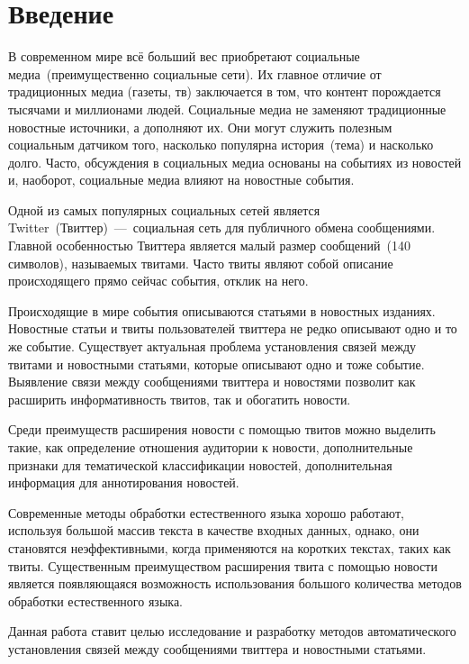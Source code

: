 \section*{Введение}
    В современном мире всё больший вес приобретают социальные медиа~(преимущественно социальные сети).
    Их главное отличие от традиционных медиа (газеты, тв) заключается в том, что контент порождается тысячами и миллионами людей.
    Социальные медиа не заменяют традиционные новостные источники, а дополняют их.
    Они могут служить полезным социальным датчиком того, насколько популярна история~(тема) и насколько долго.
    Часто, обсуждения в социальных медиа основаны на событиях из новостей и, наоборот, социальные медиа влияют на новостные события.

    Одной из самых популярных социальных сетей является Twitter~(Твиттер)~---~социальная сеть для публичного обмена сообщениями.
    Главной особенностью Твиттера является малый размер сообщений~(140 символов), называемых твитами.
    Часто твиты являют собой описание происходящего прямо сейчас события, отклик на него.

    Происходящие в мире события описываются статьями в новостных изданиях.
    Новостные статьи и твиты пользователей твиттера не редко описывают одно и то же событие.
    Существует актуальная проблема установления связей между твитами и новостными статьями, которые описывают одно и тоже событие.
    Выявление связи между сообщениями твиттера и новостями позволит как расширить информативность твитов, так и обогатить новости.

    Среди преимуществ расширения новости с помощью твитов можно выделить такие, как определение отношения аудитории к новости,
    дополнительные признаки для тематической классификации новостей, дополнительная информация для аннотирования новостей.

    Современные методы обработки естественного языка хорошо работают, используя большой массив текста в качестве входных данных, однако, они становятся неэффективными,
    когда применяются на коротких текстах, таких как твиты.
    Существенным преимуществом расширения твита с помощью новости является появляющаяся возможность использования большого количества методов обработки естественного языка.

    Данная работа ставит целью исследование и разработку методов автоматического установления связей между сообщениями твиттера и новостными статьями.

    \clearpage